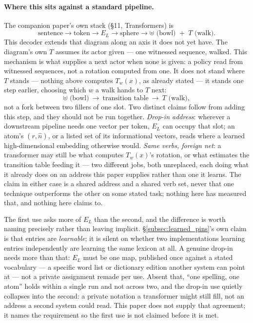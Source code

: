 \documentclass[12pt, a4paper]{article}
\begin{document}
\paragraph{Where this sits against a standard pipeline.} The
companion paper's own stack (\S11, Transformers) is
\[
\text{sentence}\to\text{token}\to E_L\to\text{sphere}\to
\uplus\text{ (bowl) }+\;T\text{ (walk)}.
\]
This decoder extends that diagram along an axis it does not yet
have. The diagram's own $T$ assumes its actor given --- one
witnessed sequence, walked. This mechanism is what supplies a next
actor when none is given: a policy read from witnessed sequences,
not a rotation computed from one. It does not stand where $T$
stands --- nothing above computes $T_w(x)$, as already stated ---
it stands one step earlier, choosing which $w$ a
walk hands to $T$ next:
\[
\uplus\text{ (bowl)}\ \to\ \text{transition table}\ \to\ T\text{ (walk)},
\]
not a fork between two fillers of one slot. Two distinct claims
follow from adding this step, and they should not be run together.
\emph{Drop-in address}: wherever a downstream pipeline needs one
vector per token, $E_L$ can occupy that slot; an atom's $(r,\hat
n)$, or a listed set of its informational vectors, reads where a learned
high-dimensional embedding otherwise would. \emph{Same verbs,
foreign net}: a transformer may still be what computes $T_w(x)$'s
rotation, or what estimates the transition table feeding it --- two
different jobs, both unreplaced, each doing what it already does on
an address this paper supplies rather than one it learns. The claim
in either case is a shared address and a shared verb set, never that
one technique outperforms the other on some stated task; nothing
here has measured that, and nothing here claims to.

The first use asks more of $E_L$ than the second, and the difference
is worth naming precisely rather than leaving implicit.
\S\ref{subsec:learned_pins}'s own claim is that entries are
\emph{learnable}; it is silent on whether two implementations
learning entries independently are learning the same lexicon at all.
A genuine drop-in needs more than that: $E_L$ must be one map,
published once against a stated vocabulary --- a specific word list
or dictionary edition another system can point at --- not a private
assignment remade per use. Absent that, ``one spelling, one atom''
holds within a single run and not across two, and the drop-in use
quietly collapses into the second: a private notation a transformer
might still fill, not an address a second system could read. This
paper does not supply that agreement; it names the requirement so
the first use is not claimed before it is met.
\end{document}
